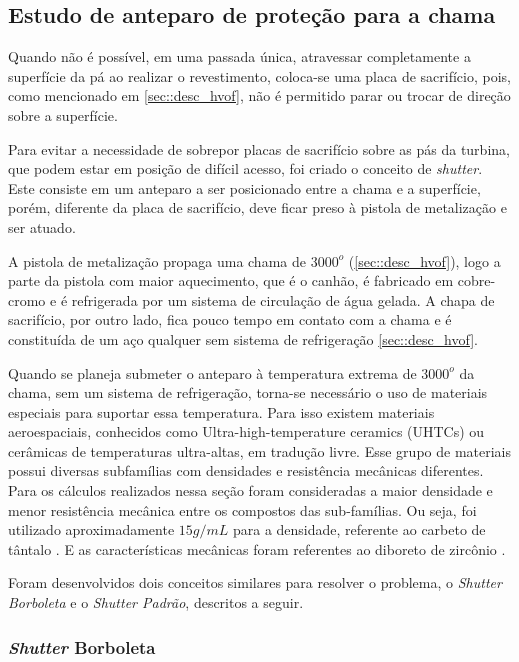 \subsection{Estudo de anteparo de proteção para a chama}
Quando não é possível, em uma passada única, atraves\-sar completamente a
superfície da pá ao realizar o revestimento, coloca-se uma placa de sacrifício,
pois, como menciona\-do em \ref{sec::desc_hvof}, não é permitido parar ou trocar
de direção sobre a superfície.

Para evitar a necessidade de sobrepor placas de sacrifício sobre as pás da
turbina, que podem estar em posição de difícil acesso, foi criado o conceito de
\textit{shutter}. Este consiste em um anteparo a ser posicionado entre a chama e
a superfície, porém, diferente da placa de sacrifício, deve ficar preso à
pistola de metalização e ser atuado.

A pistola de metalização propaga uma chama de $3000^o$ (\ref{sec::desc_hvof}),
logo a parte da pistola com maior aquecimento, que é o canhão, é fabricado em
cobre-cromo e é refrigerada por um sistema de circulação de água
gelada. A chapa de sacrifício, por outro lado, fica pouco tempo em contato com
a chama e é constituída de um aço qualquer sem sistema de refrigeração
\ref{sec::desc_hvof}.

Quando se planeja submeter o anteparo à temperatu\-ra extrema de $3000^o$ da
chama, sem um sistema de refrigeração, torna-se necessário o uso de materia\-is
especiais para suportar essa temperatura. Para isso existem materiais
aeroespaciais, conhecidos como Ultra-high-temperature ceramics (UHTCs) ou
cerâmi\-cas de temperaturas ultra-altas, em tradução livre. Esse grupo de
materiais possui diversas subfamílias com densidades e resistência mecânicas
diferentes. Para os cálculos realizados nessa seção foram consideradas a maior
densidade e menor resistência mecânica entre os compostos das sub-famílias. Ou
seja, foi utilizado aproximadamente \textbf{$15 g/mL$} para a densidade, referente ao
carbeto de tântalo \citep{bansal2005ceramic}. E as características mecânicas
foram referentes ao diboreto de zircônio \citep{diborides}.

Foram desenvolvidos dois conceitos similares para resolver o problema, o \textit{Shutter
Borboleta} e o \textit{Shutter Padrão}, descritos a seguir.

\subsubsection{\textit{Shutter} Borboleta}
\label{borboleta}


